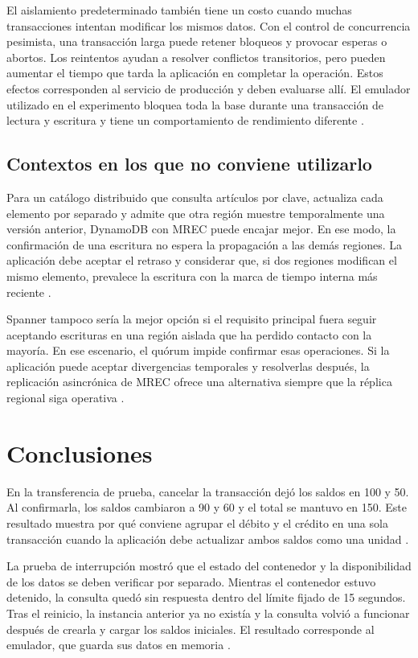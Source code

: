 \documentclass[11pt,a4paper]{article}
\begin{document}
El aislamiento predeterminado también tiene un costo cuando muchas transacciones intentan modificar los mismos datos. Con el control de concurrencia pesimista, una transacción larga puede retener bloqueos y provocar esperas o abortos. Los reintentos ayudan a resolver conflictos transitorios, pero pueden aumentar el tiempo que tarda la aplicación en completar la operación. Estos efectos corresponden al servicio de producción y deben evaluarse allí. El emulador utilizado en el experimento bloquea toda la base durante una transacción de lectura y escritura y tiene un comportamiento de rendimiento diferente \cite{GoogleSpannerTransactions,GoogleSpannerEmulator}.

\subsection{Contextos en los que no conviene utilizarlo}
Para un catálogo distribuido que consulta artículos por clave, actualiza cada elemento por separado y admite que otra región muestre temporalmente una versión anterior, DynamoDB con MREC puede encajar mejor. En ese modo, la confirmación de una escritura no espera la propagación a las demás regiones. La aplicación debe aceptar el retraso y considerar que, si dos regiones modifican el mismo elemento, prevalece la escritura con la marca de tiempo interna más reciente \cite{ElhemaliEtAl2022DynamoDB,AWSGlobalTables}.

Spanner tampoco sería la mejor opción si el requisito principal fuera seguir aceptando escrituras en una región aislada que ha perdido contacto con la mayoría. En ese escenario, el quórum impide confirmar esas operaciones. Si la aplicación puede aceptar divergencias temporales y resolverlas después, la replicación asincrónica de MREC ofrece una alternativa siempre que la réplica regional siga operativa \cite{GoogleSpannerReplication,AWSGlobalTables}.

\section{Conclusiones}
En la transferencia de prueba, cancelar la transacción dejó los saldos en 100 y 50. Al confirmarla, los saldos cambiaron a 90 y 60 y el total se mantuvo en 150. Este resultado muestra por qué conviene agrupar el débito y el crédito en una sola transacción cuando la aplicación debe actualizar ambos saldos como una unidad \cite{GoogleSpannerTransactions}.

La prueba de interrupción mostró que el estado del contenedor y la disponibilidad de los datos se deben verificar por separado. Mientras el contenedor estuvo detenido, la consulta quedó sin respuesta dentro del límite fijado de 15 segundos. Tras el reinicio, la instancia anterior ya no existía y la consulta volvió a funcionar después de crearla y cargar los saldos iniciales. El resultado corresponde al emulador, que guarda sus datos en memoria \cite{GoogleSpannerEmulator}.
\end{document}
